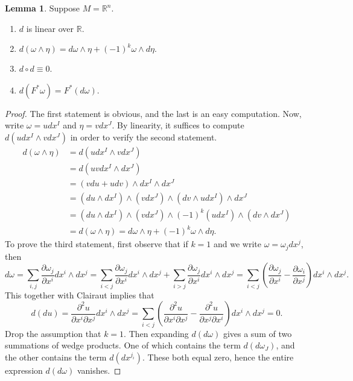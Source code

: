 \documentclass[10pt,letterpaper,cm]{nupset}
\theoremstyle{definition}
\newtheorem{lemma}{Lemma}
\newcommand{\R}{\mathbb R}
\newcommand{\1}{\mathbf{1}}
\newcommand{\0}{\vec 0}
\begin{document}
\begin{lemma} Suppose $M = \R^n$.
\begin{enumerate}
\item $d$ is linear over $\R$.
\item $d( \omega \wedge \eta) = d \omega \wedge \eta + (-1)^k\omega \wedge d \eta.$
\item $d \circ d \equiv 0$.
\item $d(F^{\ast} \omega) = F^{\ast}(d \omega).$
\end{enumerate}
\end{lemma}
\begin{proof}
The first statement is obvious, and the last is an easy computation. Now, write $\omega = udx^I$ and $\eta = v dx^J$. By linearity, it suffices to compute $d(udx^I \wedge v dx^J)$ in order to verify the second statement. 
\begin{align*}
 d(\omega \wedge \eta) &= d(udx^I \wedge vdx^J) \\
& = d(uvdx^I \wedge dx^J)
\\ & = (vdu + udv) \wedge dx^I \wedge dx^J
\\ & = (du \wedge dx^I) \wedge (v dx^J) \wedge (dv \wedge u dx^I) \wedge dx^J
\\ & = (du \wedge dx^I) \wedge (v dx^J) \wedge (-1)^k(udx^I) \wedge (dv \wedge dx^J)
\\ & = d( \omega \wedge \eta) = d \omega \wedge \eta + (-1)^k\omega \wedge d \eta .
\end{align*}
To prove the third statement, first observe that if $k=1$ and we write $\omega = \omega_jdx^j$, then $$d \omega =   \sum_{i, j}\frac{\partial{\omega_j}}{\partial{x^i}}dx^i \wedge dx^j = \sum_{i< j}\frac{\partial{\omega_j}}{\partial{x^i}}dx^i \wedge dx^j + \sum_{i>j}\frac{\partial{\omega_j}}{\partial{x^i}}dx^i \wedge dx^j =\sum_{i<j}(\frac{\partial{\omega_j}}{\partial{x^i}} - \frac{\partial{\omega_i}}{\partial{x^j}})dx^i \wedge dx^j.$$ This together with Clairaut implies that  $$d(du) =\frac{\partial^2{u}}{\partial{x^i}\partial{x^j}}dx^i \wedge dx^j = \sum_{i<j}( \frac{\partial^2{u}}{\partial{x^i}\partial{x^j}} - \frac{\partial^2{u}}{\partial{x^j}\partial{x^i}})dx^i \wedge dx^j = 0.  $$ Drop the assumption that $k=1$. Then expanding $d(d\omega)$ gives a sum of two summations of wedge products. One of which contains the term $d(d\omega_J)$, and the other contains the term $d(dx^{j_i})$. These both equal zero, hence the entire expression $d(d\omega)$ vanishes.
\end{proof}
\end{document}
